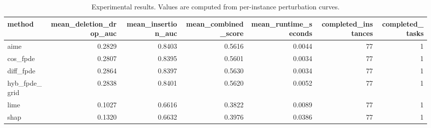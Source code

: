 \begin{table}[t]
\caption{Experimental results. Values are computed from per-instance perturbation curves.}
\label{tab:main_results_computed}
\centering
\begin{tabular}{lrrrrrr}
\toprule
method & mean\_deletion\_drop\_auc & mean\_insertion\_auc & mean\_combined\_score & mean\_runtime\_seconds & completed\_instances & completed\_tasks \\
\midrule
aime & 0.2829 & 0.8403 & 0.5616 & 0.0044 & 77 & 1 \\
cos\_fpde & 0.2807 & 0.8395 & 0.5601 & 0.0034 & 77 & 1 \\
diff\_fpde & 0.2864 & 0.8397 & 0.5630 & 0.0034 & 77 & 1 \\
hyb\_fpde\_grid & 0.2838 & 0.8401 & 0.5620 & 0.0052 & 77 & 1 \\
lime & 0.1027 & 0.6616 & 0.3822 & 0.0089 & 77 & 1 \\
shap & 0.1320 & 0.6632 & 0.3976 & 0.0386 & 77 & 1 \\
\bottomrule
\end{tabular}

\end{table}
